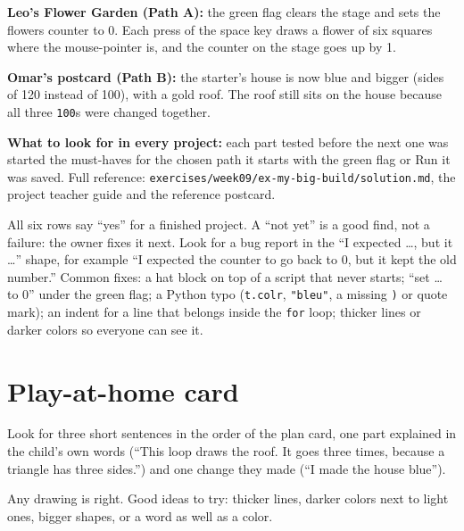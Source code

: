 \begin{answer}
\textbf{Leo's Flower Garden (Path A):} the green flag clears the stage and sets the flowers counter to 0. Each press of the space key draws a flower of six squares where the mouse-pointer is, and the counter on the stage goes up by 1.

\textbf{Omar's postcard (Path B):} the starter's house is now blue and bigger (sides of 120 instead of 100), with a gold roof. The roof still sits on the house because all three \texttt{100}s were changed together.

\textbf{What to look for in every project:} \tickbox{} each part tested before the next one was started \quad \tickbox{} the must-haves for the chosen path \quad \tickbox{} it starts with the green flag or Run \quad \tickbox{} it was saved. Full reference: \texttt{exercises/week09/ex-my-big-build/solution.md}, the project teacher guide and the reference postcard.
\end{answer}

\begin{answer}
All six rows say \enquote{yes} for a finished project. A \enquote{not yet} is a good find, not a failure: the owner fixes it next. Look for a bug report in the \enquote{I expected \ldots, but it \ldots} shape, for example \enquote{I expected the counter to go back to 0, but it kept the old number.} Common fixes: a hat block on top of a script that never starts; \enquote{set \ldots{} to 0} under the green flag; a Python typo (\texttt{t.colr}, \texttt{"bleu"}, a missing \texttt{)} or quote mark); an indent for a line that belongs inside the \texttt{for} loop; thicker lines or darker colors so everyone can see it.
\end{answer}

\section{Play-at-home card}
\begin{answer}
Look for three short sentences in the order of the plan card, one part explained in the child's own words (\enquote{This loop draws the roof. It goes three times, because a triangle has three sides.}) and one change they made (\enquote{I made the house blue}).
\end{answer}

\begin{answer}
Any drawing is right. Good ideas to try: thicker lines, darker colors next to light ones, bigger shapes, or a word as well as a color.
\end{answer}
